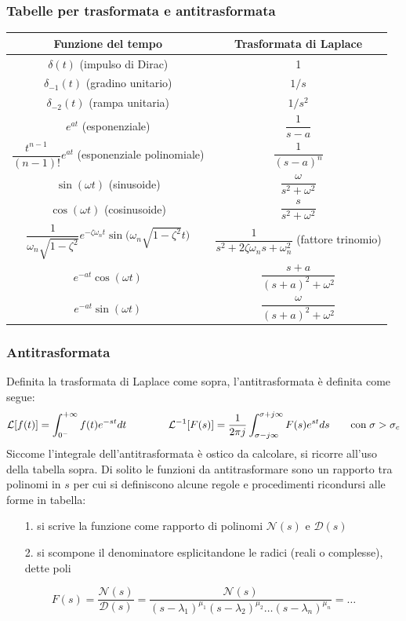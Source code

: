 \subsubsection*{Tabelle per trasformata e antitrasformata}
\begin{center}
	\begin{tabularx}{\textwidth}{ C | C }
		\textbf{Funzione del tempo} & \textbf{Trasformata di Laplace} \\
		\toprule
		\(\delta(t)\) (impulso di Dirac) & 1 \\
		\midrule
		\(\delta_{-1}(t)\) (gradino unitario) & \(1/s\) \\
		\midrule
		\(\delta_{-2}(t)\) (rampa unitaria) & \(1/s^2\) \\
		\midrule
		\(e^{at}\) (esponenziale) & \(\dfrac{1}{s - a}\) \\
		\midrule
		\(\dfrac{t^{n-1}}{(n-1)!} e^{at}\) (esponenziale polinomiale) & \(\dfrac{1}{(s - a)^n}\) \\
		\midrule
		\(\sin(\omega t)\) (sinusoide) & \(\dfrac{\omega}{s^2 + \omega^2}\) \\
		\midrule
		\(\cos(\omega t)\) (cosinusoide) & \(\dfrac{s}{s^2 + \omega^2}\) \\
		\midrule
		\(\dfrac{1}{\omega_n \sqrt{1 - \zeta^2}} e^{-\zeta \omega_n t} \sin\big(\omega_n \sqrt{1 - \zeta^2} t \big)\) & 
		\(\dfrac{1}{s^2 + 2\zeta \omega_n s + \omega_n^2}\) (fattore trinomio) \\
		\midrule
		\(e^{-at} \cos(\omega t)\) & \(\dfrac{s + a}{(s + a)^2 + \omega^2}\) \\
		\midrule
		\(e^{-at} \sin(\omega t)\) & \(\dfrac{\omega}{(s + a)^2 + \omega^2}\)
	\end{tabularx}
\end{center}

\subsubsection*{Antitrasformata}
Definita la trasformata di Laplace come sopra, l'antitrasformata è definita come segue:
\[\mathcal{L}[f(t)] = \int_{0^-}^{+\infty} f(t) e^{-st} dt \qquad\qquad \mathcal{L}^{-1}[F(s)] = \frac{1}{2\pi j} \int_{\sigma-j\infty}^{\sigma+j\infty} F(s) e^{st} ds \qquad \text{con} \; \sigma > \sigma_c\]
Siccome l'integrale dell'antitrasformata è ostico da calcolare, si ricorre all'uso della tabella sopra. Di solito le funzioni
da antitrasformare sono un rapporto tra polinomi in \(s\) per cui si definiscono alcune regole e procedimenti ricondursi alle
forme in tabella:
\begin{itemize}
	\item[1.] si scrive la funzione come rapporto di polinomi \(\mathcal{N}(s)\) e \(\mathcal{D}(s)\)
	\item[2.] si scompone il denominatore esplicitandone le radici (reali o complesse), dette poli
\end{itemize}
\[F(s) = \frac{\mathcal{N}(s)}{\mathcal{D}(s)} = \frac{\mathcal{N}(s)}{(s-\lambda_1)^{\mu_1}(s-\lambda_2)^{\mu_2}\dots(s-\lambda_n)^{\mu_n}} = \dots\]

